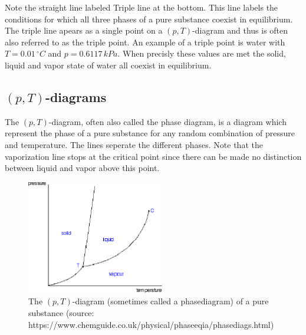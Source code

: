 \documentclass[11pt, a4paper]{article}
\begin{document}
Note the straight line labeled Triple line at the bottom. This line labels the conditions for which all three phases of a pure substance coexist in equilibrium. The triple line apears as a single point on a $(p, T)$-diagram and thus is often also referred to as the triple point. An example of a triple point is water with $T=0.01\, ^\circ C$ and $p=0.6117\,kPa$. When precisly these values are met the solid, liquid and vapor state of water all coexist in equilibrium.


\subsection{$(p,T)$-diagrams}
The $(p, T)$-diagram, often also called the phase diagram, is a diagram which represent the phase of a pure substance for any random combination of pressure and temperature. The lines seperate the different phases. Note that the vaporization line stops at the critical point since there can be made no distinction between liquid and vapor above this point.
\begin{figure}[h]
  \centerline{\includegraphics[width=60mm]{images/p,T diagram.png}}
  \caption{The $(p, T)$-diagram (sometimes called a phasediagram) of a pure substance (source: https://www.chemguide.co.uk/physical/phaseeqia/phasediags.html)}
\end{figure}
\end{document}
